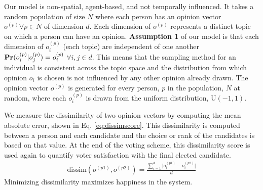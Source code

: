 
Our model is non-spatial, agent-based, and not temporally influenced.
It takes a random population of size $N$ where each person has an opinion vector $o^{(p)} \forall p \in N$ of dimension $d$.
Each dimension of $o^{(p)}$ represents a distinct topic on which a person can have an opinion.
{\bf Assumption 1} of our model is that each dimension of $o^{(p)}_i$ (each topic) are independent of one another $\text{\bf Pr}(o^{(p)}_i | o^{(p)}_j) = o^{(p)}_i $  $\forall i,j \in d$.
This means that the sampling method for an individual is consistent across the topic space and the distribution from which opinion $o_i$ is chosen is not influenced by any other opinion already drawn.
The opinion vector $o^{(p)}$ is generated for every person, $p$ in the population, $N$ at random, where each $o^{(p)}_i$ is drawn from the uniform distribution, U$(-1,1)$.

We measure the dissimilarity of two opinion vectors by computing the mean absolute error, shown in Eq. \ref{eq:dissimscore}.
This dissimilarity is computed between a person and each candidate and the choice or rank of the candidates is based on that value.
At the end of the voting scheme, this dissimilarity score is used again to quantify voter satisfaction with the final elected candidate.
\begin{align}
\text{dissim}(o^{(p1)},o^{(p2)}) = \frac{\sum_{i=1}^{d}\Big|o^{(p1)}_i - o^{(p2)}_i\Big|}{d}
\label{eq:dissimscore}
\end{align}
Minimizing dissimilarity maximizes happiness in the system.


